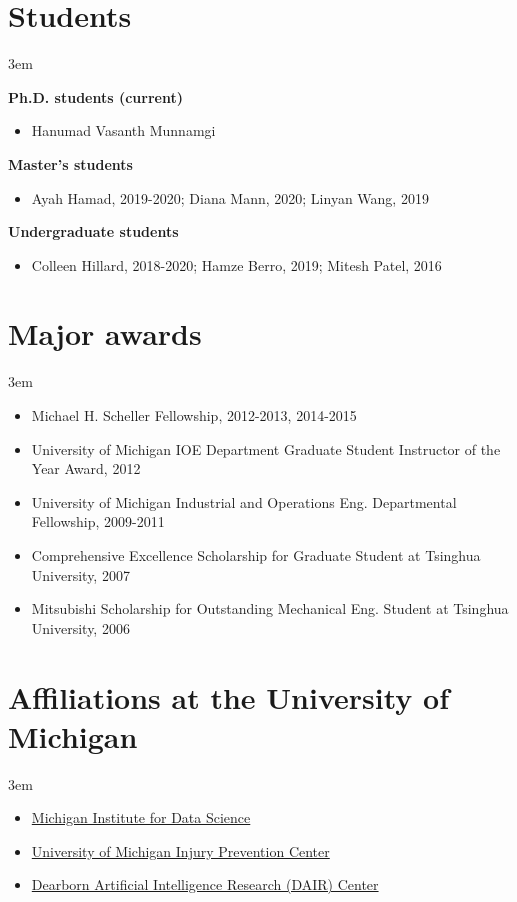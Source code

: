 \documentclass[11pt]{article}
\newenvironment{main}
{\begin{adjustwidth}{3em}{}}
{\end{adjustwidth}}
\begin{document}
\section*{Students}
\begin{main}

\textbf{Ph.D. students (current)}
\begin{itemize}
    \item Hanumad Vasanth Munnamgi
\end{itemize}

\textbf{Master’s students}
\begin{itemize}
    \item Ayah Hamad, 2019-2020; Diana Mann, 2020; Linyan Wang, 2019
\end{itemize}

\textbf{Undergraduate students}
\begin{itemize}
    \item Colleen Hillard, 2018-2020; Hamze Berro, 2019; Mitesh Patel, 2016
\end{itemize}


\end{main}
\section*{Major awards}
\begin{main}

\begin{itemize}
    \item Michael H. Scheller Fellowship, 2012-2013, 2014-2015
    \item University of Michigan IOE Department Graduate Student Instructor of the Year Award, 2012
    \item University of Michigan Industrial and Operations Eng. Departmental Fellowship, 2009-2011
    \item Comprehensive Excellence Scholarship for Graduate Student at Tsinghua University, 2007
    \item Mitsubishi Scholarship for Outstanding Mechanical Eng. Student at Tsinghua University, 2006
\end{itemize}


\end{main}
\section*{Affiliations at the University of Michigan}
\begin{main}

\begin{itemize}
    \item \href{https://midas.umich.edu/}{Michigan Institute for Data Science}
    \item \href{https://injurycenter.umich.edu/}{University of Michigan Injury Prevention Center}
    \item \href{https://dair.iselab.us/}{Dearborn Artificial Intelligence Research (DAIR) Center}
\end{itemize}


\end{main}
\end{document}
